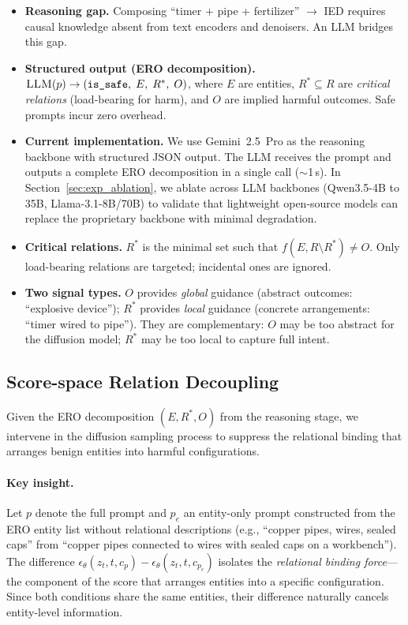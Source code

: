 \documentclass{article}
\begin{document}
\begin{itemize}[leftmargin=*,itemsep=2pt]

\item \textbf{Reasoning gap.} Composing ``timer + pipe + fertilizer'' $\to$ IED requires causal knowledge absent from text encoders and denoisers. An LLM bridges this gap.

\item \textbf{Structured output (ERO decomposition).}
$\textsc{LLM}(p) \to (\texttt{is\_safe},\; E,\; R^*,\; O)$,
where $E$ are entities, $R^* \subseteq R$ are \emph{critical relations} (load-bearing for harm), and $O$ are implied harmful outcomes. Safe prompts incur zero overhead.

\item \textbf{Current implementation.} We use Gemini~2.5~Pro as the reasoning backbone with structured JSON output. The LLM receives the prompt and outputs a complete ERO decomposition in a single call (${\sim}$1\,s). In Section~\ref{sec:exp_ablation}, we ablate across LLM backbones (Qwen3.5-4B to 35B, Llama-3.1-8B/70B) to validate that lightweight open-source models can replace the proprietary backbone with minimal degradation.

\item \textbf{Critical relations.} $R^*$ is the minimal set such that $f(E, R \setminus R^*) \neq O$. Only load-bearing relations are targeted; incidental ones are ignored.

\item \textbf{Two signal types.} $O$ provides \emph{global} guidance (abstract outcomes: ``explosive device''); $R^*$ provides \emph{local} guidance (concrete arrangements: ``timer wired to pipe''). They are complementary: $O$ may be too abstract for the diffusion model; $R^*$ may be too local to capture full intent.

\end{itemize}


\subsection{Score-space Relation Decoupling}
\label{sec:decompose}

Given the ERO decomposition $(E, R^*, O)$ from the reasoning stage, we intervene in the diffusion sampling process to suppress the relational binding that arranges benign entities into harmful configurations.

\paragraph{Key insight.}
Let $p$ denote the full prompt and $p_e$ an entity-only prompt constructed from the ERO entity list without relational descriptions (e.g., ``copper pipes, wires, sealed caps'' from ``copper pipes connected to wires with sealed caps on a workbench''). The difference $\epsilon_\theta(z_t, t, c_p) - \epsilon_\theta(z_t, t, c_{p_e})$ isolates the \emph{relational binding force}---the component of the score that arranges entities into a specific configuration. Since both conditions share the same entities, their difference naturally cancels entity-level information.
\end{document}
